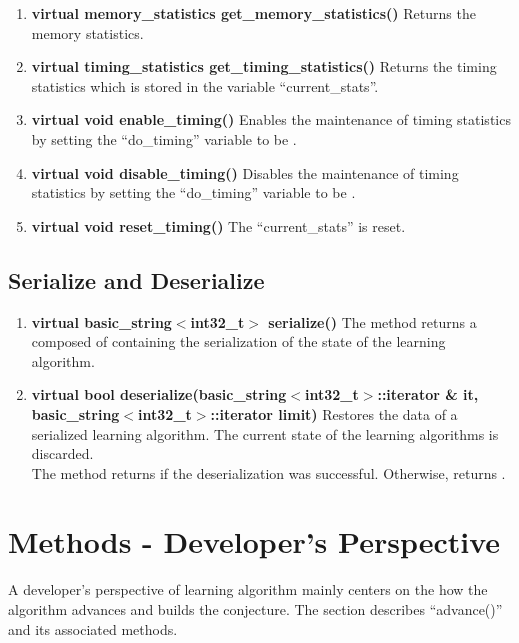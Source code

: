 \begin{enumerate}
 \item \textbf{virtual memory\_statistics get\_memory\_statistics()} \vskip 1pt
	Returns the memory statistics.

 \item \textbf{virtual timing\_statistics get\_timing\_statistics()} \vskip 1pt
	Returns the timing statistics which is stored in the variable ``current\_stats''.

 \item \textbf{virtual void enable\_timing()} \vskip 1pt
	Enables the maintenance of timing statistics by setting the ``do\_timing'' variable to be \true.

 \item \textbf{virtual void disable\_timing()} \vskip 1pt
	Disables the maintenance of timing statistics by setting the ``do\_timing'' variable to be \false.

 \item \textbf{virtual void reset\_timing()} \vskip 1pt
	The ``current\_stats'' is reset.
\end{enumerate}



\subsection*{Serialize and Deserialize}

\begin{enumerate}
 \item \textbf{virtual basic\_string$<$int32\_t$>$ serialize()} \vskip 1pt
	The method returns a \stringtype composed of \integer containing the serialization of the state of the learning algorithm.

 \item \textbf{virtual bool deserialize(basic\_string$<$int32\_t$>$::iterator \& it, basic\_string$<$int32\_t$>$::iterator limit)} \vskip 1pt
	Restores the data of a serialized learning algorithm. The current state of the learning algorithms is discarded. \\
	The method returns \true if the deserialization was successful. Otherwise, returns \false.
\end{enumerate}


\section{Methods - Developer's Perspective}

A developer's perspective of learning algorithm mainly centers on the how the algorithm advances and builds the conjecture. The section describes ``advance()'' and its associated methods.

